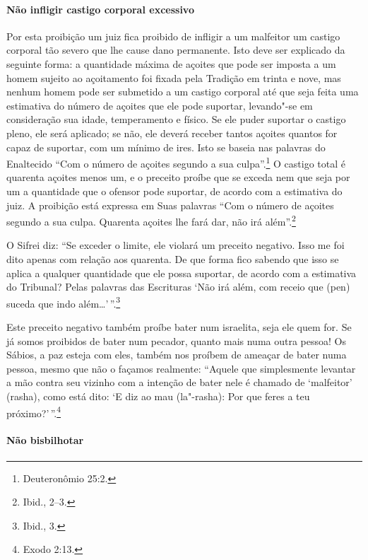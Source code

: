 \begin{multicols}{2}
\paragraph{Não infligir castigo corporal excessivo}

Por esta proibição um juiz fica proibido de infligir a um malfeitor um
castigo corporal tão severo que lhe cause dano permanente. Isto deve ser
explicado da seguinte forma: a quantidade máxima de açoites que pode ser
imposta a um homem sujeito ao açoitamento foi fixada pela Tradição em
trinta e nove, mas nenhum homem pode ser submetido a um castigo corporal
até que seja feita uma estimativa do número de açoites que ele pode
suportar, levando"-se em consideração sua idade, temperamento e físico.
Se ele puder suportar o castigo pleno, ele será aplicado; se não, ele
deverá receber tantos açoites quantos for capaz de suportar, com um mínimo de
ires. Isto se baseia nas palavras do Enaltecido ``Com o número de açoites segundo a
sua culpa''.\footnote{Deuteronômio 25:2.} O castigo total é quarenta açoites
menos um, e o preceito proíbe que se exceda nem que seja por um a
quantidade que o ofensor pode suportar, de acordo com a estimativa do
juiz. A proibição está expressa em Suas palavras ``Com o número de
açoites segundo a sua culpa. Quarenta açoites lhe fará dar, não irá
além''.\footnote{Ibid., 2--3.}

O Sifrei\starr{} diz: ``Se exceder o limite, ele violará um preceito negativo.
Isso me foi dito apenas com relação aos quarenta. De que forma fico
sabendo que isso se aplica a qualquer quantidade que ele possa suportar,
de acordo com a estimativa do Tribunal? Pelas palavras das Escrituras
`Não irá além, com receio que (pen) suceda que indo além\ldots{}'\,''.\footnote{Ibid., 3.}

Este preceito negativo também proíbe bater num israelita, seja ele quem
for. Se já somos proibidos de bater num pecador, quanto mais numa outra
pessoa! Os Sábios, a paz esteja com eles, também nos proíbem de ameaçar
de bater numa pessoa, mesmo que não o façamos realmente: ``Aquele que
simplesmente levantar a mão contra seu vizinho com a intenção de bater
nele é chamado de `malfeitor' (rasha\starr), como está dito: `E diz ao mau
(la"-rasha\starr): Por que feres a teu próximo?'\,''.\footnote{Exodo 2:13.}

\paragraph{Não bisbilhotar}


\end{multicols}
